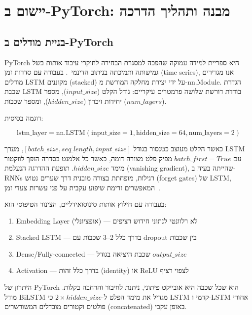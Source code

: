 \chapter{יישום ב-PyTorch: מבנה ותהליך הדרכה}

\section{בניית מודלים ב-PyTorch}

PyTorch היא ספריית למידה עמוקה שהפכה למסגרת הבחירה לחוקרי עיבוד אותות בשל גמישותה ותמיכתה בניתוב הדינמי~\cite{brown2020language}. בעבודה עם סדרות זמן (time series), אנו מגדירים מודלים LSTM מקוננים (stacked) על ידי יצירת מחלקה המורשת מ-\textenglish{nn.Module}. הגדרת שכבת LSTM בודדת דורשת שלושה פרמטרים עיקריים: גודל הקלט (\textenglish{$input\_size$}), מספר יחידות זיכרון (\textenglish{$hidden\_size$}), ומספר שכבות (\textenglish{$num\_layers$}).

דוגמה בסיסית:

\begin{equation}
\text{lstm\_layer} = \text{nn.LSTM}(\text{input\_size}=1, \text{hidden\_size}=64, \text{num\_layers}=2)
\end{equation}

כאשר הקלט מעוצב כטנסור בגודל \textenglish{$[batch\_size, seq\_length, input\_size]$}, מערך LSTM עם \textenglish{$batch\_first=True$} מפיק פלט מצורה דומה, כאשר כל אלמנט בסדרה הופך לווקטור מימד \textenglish{$hidden\_size$}. תופעת ההדרגה הנעלמת (vanishing gradient), שהייתה בעיה ב-RNNs רגילות, מופחתת בצורה מובנית דרך שערים נטוש (forget gates) של LSTM, המאפשרים זרימת שיפוע עקבית על פני עשרות צעדי זמן~\cite{xi2023rise}.

בעבודה עם חילוץ אותות סינוסואידליים, הצינור הטיפוסי הוא:

\begin{enumerate}
\item \textenglish{Embedding Layer} (אופציונלי) --- לא רלוונטי לנתוני חידוש רציפים
\item \textenglish{Stacked LSTM} --- בדרך כלל 2--3 שכבות עם dropout בין שכבות
\item \textenglish{Dense/Fully-connected} --- שכבת היציאה בגודל \textenglish{$output\_size$}
\item \textenglish{Activation} --- בדרך כלל זהות (identity) או \textenglish{ReLU} לצפוי רציף
\end{enumerate}

היתרון של PyTorch הוא שכל שכבה היא אובייקט פיתוני, ניתנת לחיבור והרחבה בקלות. מודל BiLSTM מגדיל את מימד הפלט ל-\textenglish{$2 × hidden\_size$} כי LSTM קדמי ו-LSTM אחורי פולטים וקטורים מובדלים המשורשרים (concatenated) באופן עקבי.

